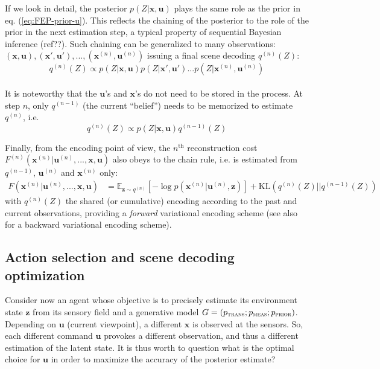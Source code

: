 \documentclass[12pt,twoside,openright]{article}
\begin{document}
If we look in detail, the posterior $p(Z|\boldsymbol{x},\boldsymbol{u})$ plays the same role as the prior in eq. (\ref{eq:FEP-prior-u}). This reflects the chaining of the posterior to the role of the prior in the next estimation step, a typical property of sequential Bayesian inference {\color{magenta}(ref??)}.
Such chaining can be generalized to many observations: $(\boldsymbol{x},\boldsymbol{u}), (\boldsymbol{x}',\boldsymbol{u}'), ... , (\boldsymbol{x}^{(n)},\boldsymbol{u}^{(n)})$ issuing a final scene decoding $q^{(n)}(Z)$:
$$ q^{(n)}(Z) \propto p(Z|\boldsymbol{x},\boldsymbol{u}) p(Z|\boldsymbol{x}',\boldsymbol{u}') ... p(Z|\boldsymbol{x}^{(n)},\boldsymbol{u}^{(n)}) $$\\
It is noteworthy that the $\boldsymbol{u}$'s and $\boldsymbol{x}$'s do not need to be stored in the process. At step $n$, only $q^{(n-1)}$ (the current ``belief'') needs to be memorized to estimate $q^{(n)}$, i.e. 
$$ q^{(n)}(Z) \propto p(Z|\boldsymbol{x},\boldsymbol{u}) q^{(n-1)}(Z) $$

Finally, from the encoding point of view, the $n^\text{th}$ reconstruction cost $F^{(n)}(\boldsymbol{x}^{(n)}|\boldsymbol{u}^{(n)}, ..., \boldsymbol{x}, \boldsymbol{u})$ also obeys to the chain rule, i.e. is estimated from $q^{(n-1)}$, $\boldsymbol{u}^{(n)}$ and $\boldsymbol{x}^{(n)}$ only:
\begin{align}
F(\boldsymbol{x}^{(n)}|\boldsymbol{u}^{(n)}, ...,  \boldsymbol{x}, \boldsymbol{u}) 
&= \mathbb{E}_{\boldsymbol{z} \sim q^{(n)}} \left[-\log p(\boldsymbol{x}^{(n)}| \boldsymbol{u}^{(n)}, \boldsymbol{z})\right] + \text{KL}(q^{(n)}(Z)||q^{(n-1)}(Z))
\label{eq:FEP-uxun}
\end{align}
with $q^{(n)}(Z)$ the shared (or cumulative) encoding according to the past and current observations, providing a \emph{forward} variational encoding scheme (see also \cite{fraccaro2016sequential} for a backward variational encoding scheme). 


\subsection{Action selection and scene decoding optimization}
Consider now an agent whose objective is to precisely estimate its environment state $\boldsymbol{z}$ from its sensory field and a generative model $G = (p_\text{\sc trans}; p_\text{\sc meas};p_\text{\sc prior})$.
Depending on $\boldsymbol{u}$ (current viewpoint), a different $\boldsymbol{x}$ is observed at the sensors. So, each different command $\boldsymbol{u}$ provokes a different observation, and thus a different 
estimation of the latent state. It is thus worth to question what is the optimal choice for $\boldsymbol{u}$ in order to maximize the accuracy of the posterior estimate?
\end{document}
